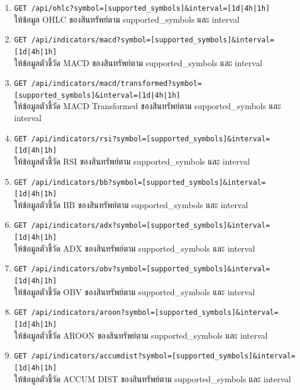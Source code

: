 \begin{enumerate}
    \overfullrule=0pt
    \item \texttt{GET {\footnotesize /api/ohlc?symbol=[supported\_symbols]\&interval=[1d|4h|1h]}} \\ให้ข้อมูล OHLC ของสินทรัพย์ตาม supported\_symbols และ interval
    \item \texttt{GET {\footnotesize /api/indicators/macd?symbol=[supported\_symbols]\&interval=[1d|4h|1h]}} \\ให้ข้อมูลตัวชี้วัด MACD ของสินทรัพย์ตาม supported\_symbols และ interval
    \item \texttt{GET {\footnotesize /api/indicators/macd/transformed?symbol=[supported\_symbols]\&interval=[1d|4h|1h]}} \\ให้ข้อมูลตัวชี้วัด MACD Transformed ของสินทรัพย์ตาม supported\_symbols และ interval
    \item \texttt{GET {\footnotesize /api/indicators/rsi?symbol=[supported\_symbols]\&interval=[1d|4h|1h]}} \\ให้ข้อมูลตัวชี้วัด RSI ของสินทรัพย์ตาม supported\_symbols และ interval
    \item \texttt{GET {\footnotesize /api/indicators/bb?symbol=[supported\_symbols]\&interval=[1d|4h|1h]}} \\ให้ข้อมูลตัวชี้วัด BB ของสินทรัพย์ตาม supported\_symbols และ interval
    \item \texttt{GET {\footnotesize /api/indicators/adx?symbol=[supported\_symbols]\&interval=[1d|4h|1h]}} \\ให้ข้อมูลตัวชี้วัด ADX ของสินทรัพย์ตาม supported\_symbols และ interval
    \item \texttt{GET {\footnotesize /api/indicators/obv?symbol=[supported\_symbols]\&interval=[1d|4h|1h]}} \\ให้ข้อมูลตัวชี้วัด OBV ของสินทรัพย์ตาม supported\_symbols และ interval
    \item \texttt{GET {\footnotesize /api/indicators/aroon?symbol=[supported\_symbols]\&interval=[1d|4h|1h]}} \\ให้ข้อมูลตัวชี้วัด AROON ของสินทรัพย์ตาม supported\_symbols และ interval
    \item \texttt{GET {\footnotesize /api/indicators/accumdist?symbol=[supported\_symbols]\&interval=[1d|4h|1h]}} \\ให้ข้อมูลตัวชี้วัด ACCUM DIST ของสินทรัพย์ตาม supported\_symbols และ interval

\end{enumerate}
